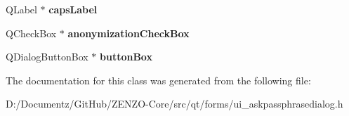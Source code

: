 \begin{DoxyCompactItemize}
Q\+Label $\ast$ {\bfseries caps\+Label}
\item 
\mbox{\label{class_ui___ask_passphrase_dialog_acf8b23be8d9eafaff15e50990d2f62e3}} 
Q\+Check\+Box $\ast$ {\bfseries anonymization\+Check\+Box}
\item 
\mbox{\label{class_ui___ask_passphrase_dialog_af299a80a704ba69920f09da7b9bc669b}} 
Q\+Dialog\+Button\+Box $\ast$ {\bfseries button\+Box}
\end{DoxyCompactItemize}


The documentation for this class was generated from the following file\+:\begin{DoxyCompactItemize}
\item 
D\+:/\+Documentz/\+Git\+Hub/\+Z\+E\+N\+Z\+O-\/\+Core/src/qt/forms/ui\+\_\+askpassphrasedialog.\+h\end{DoxyCompactItemize}
